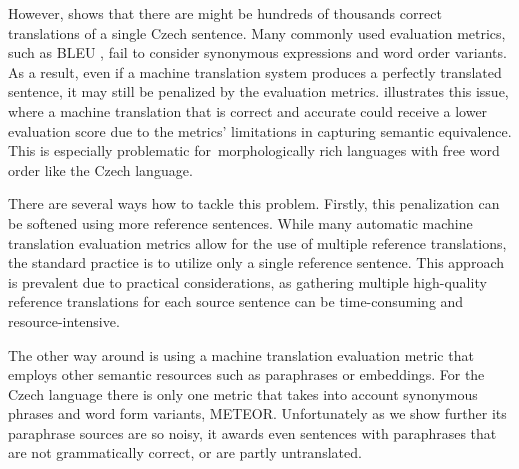 However, \citep{bojar-scratching} shows that there are might be hundreds of thousands correct translations of a single Czech sentence. Many commonly used evaluation metrics, such as BLEU \citep{bleu}, fail to consider synonymous expressions and word order variants. As a result, even if a machine translation system produces a perfectly translated sentence, it may still be penalized by the evaluation metrics.  illustrates this issue, where a machine translation that is correct and accurate could receive a lower evaluation score due to the metrics' limitations in capturing semantic equivalence. This is especially problematic for~morphologically rich languages with free word order like the Czech language. \cite{bojar-tackling-sparse-data}

There are several ways how to tackle this problem. Firstly, this penalization can be softened using more reference sentences. While many automatic machine translation evaluation metrics allow for the use of multiple reference translations, the standard practice is to utilize only a single reference sentence. This approach is prevalent due to practical considerations, as gathering multiple high-quality reference translations for each source sentence can be time-consuming and resource-intensive. 

The other way around is using a machine translation evaluation metric that employs other semantic resources such as paraphrases or embeddings. 
For the Czech language there is only one metric that takes into account synonymous phrases and word form variants, METEOR. \cite{meteor-wmt:2014}  Unfortunately as we show further its paraphrase sources are so noisy, it awards even sentences with paraphrases that are not grammatically correct, or are partly untranslated.


